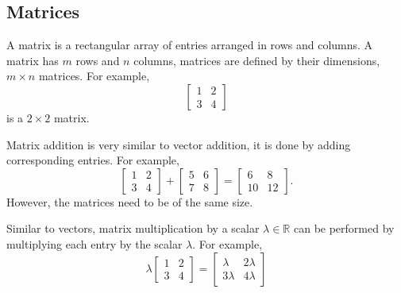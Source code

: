 \documentclass[10pt, a4paper]{article}
\newcommand{\R}{\mathbb{R}}
\begin{document}
\subsection{Matrices}
A matrix is a rectangular array of entries arranged in rows and columns. A matrix has $m$ rows and $n$ columns, matrices are defined by their dimensions, $m\times n$ matrices. For example,
\[
\begin{bmatrix}
    1 & 2 \\ 
    3 & 4
\end{bmatrix}
\]
is a $2\times 2$ matrix.

Matrix addition is very similar to vector addition, it is done by adding corresponding entries. For example,
\[
\begin{bmatrix}
    1 & 2 \\ 
    3 & 4
\end{bmatrix} + 
\begin{bmatrix}
    5 & 6 \\ 
    7 & 8
\end{bmatrix} = 
\begin{bmatrix}
    6 & 8 \\ 
    10 & 12
\end{bmatrix}.
\]
However, the matrices need to be of the same size.

Similar to vectors, matrix multiplication by a scalar $\lambda \in \R$ can be performed by multiplying each entry by the scalar $\lambda$. For example,
\[
\lambda\begin{bmatrix}
    1 & 2 \\ 
    3 & 4
\end{bmatrix} = \begin{bmatrix}
    \lambda & 2\lambda \\ 
    3\lambda & 4\lambda
\end{bmatrix}
\]
\end{document}
